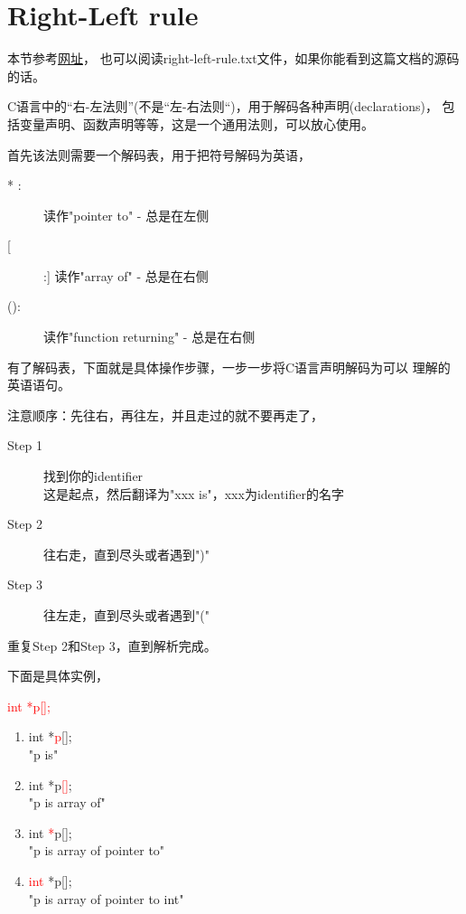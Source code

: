 ﻿\section[Right-Left rule]{Right-Left rule}
本节参考\href{http://ieng9.ucsd.edu/~cs30x/rt_lt.rule.html}{网址}，
也可以阅读right-left-rule.txt文件，如果你能看到这篇文档的源码的话。

C语言中的“右-左法则”(不是“左-右法则“)，用于解码各种声明(declarations)，
包括变量声明、函数声明等等，这是一个通用法则，可以放心使用。

首先该法则需要一个解码表，用于把符号解码为英语，
\begin{description}
  \item[* :] 读作"pointer to" - 总是在左侧
  \item[[]:] 读作"array of" - 总是在右侧
  \item[():] 读作"function returning" - 总是在右侧
\end{description}

有了解码表，下面就是具体操作步骤，一步一步将C语言声明解码为可以
理解的英语语句。

注意顺序：先往右，再往左，并且走过的就不要再走了，
\begin{description}
  \item[Step 1] 找到你的identifier\\
  这是起点，然后翻译为"xxx is"，xxx为identifier的名字
  \item[Step 2] 往右走，直到尽头或者遇到")"
  \item[Step 3] 往左走，直到尽头或者遇到"("
\end{description}
重复Step 2和Step 3，直到解析完成。

下面是具体实例，

\hspace{1cm}\textcolor{red}{int *p[];}

\begin{enumerate}
  \item int *\textcolor{red}{p}[];\\
  "p is"
  \item int *p\textcolor{red}{[]};\\
  "p is array of"
  \item int \textcolor{red}{*}p[];\\
  "p is array of pointer to"
  \item \textcolor{red}{int} *p[];\\
  "p is array of pointer to int"
\end{enumerate}
